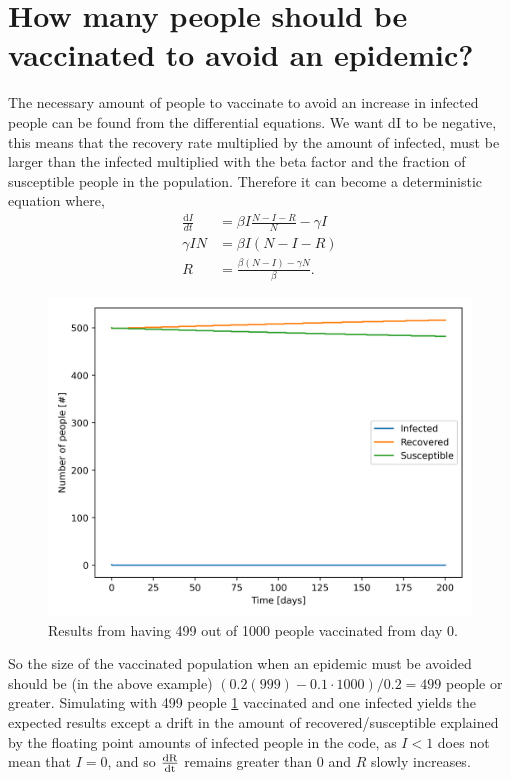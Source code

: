 \documentclass{article}
\begin{document}
\section*{How many people should be vaccinated to avoid an epidemic?}
The necessary amount of people to vaccinate to avoid an increase in infected people can be found from the differential equations. We want dI to be negative, this means that the recovery rate multiplied by the amount of infected, must be larger than the infected multiplied with the beta factor and the fraction of susceptible people in the population. Therefore it can become a deterministic equation where,
\begin{align}
    \frac{\text{d}I}{dt} &= \beta I \frac{N-I-R}{N} - \gamma I\\
 \gamma I N&=    \beta I (N-I-R) \\
     R &= \frac{\beta(N-I) - \gamma N}{\beta}.
\end{align}

\begin{figure}
    \centering
    \includegraphics[width=\textwidth]{Assignment_1_SIR/Report/Images/SIR_plot_dt0_1_vacc.png}
    \caption{Results from having 499 out of 1000 people vaccinated from day 0.}
    \label{fig:vacc}
\end{figure}

So the size of the vaccinated population when an epidemic must be avoided should be (in the above example) $(0.2(999)-0.1\cdot 1000)/0.2 = 499$ people or greater. Simulating with 499 people \cref{fig:vacc} vaccinated and one infected yields the expected results except a drift in the amount of recovered/susceptible explained by the floating point amounts of infected people in the code, as $I<1$ does not mean that $I=0$, and so $\frac{\rm{d}R}{\rm{d}t}$ remains greater than $0$ and $R$ slowly increases.
\end{document}
